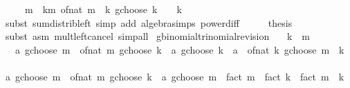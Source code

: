 \begin{isabellebody}
\ {\isachardoublequoteopen}{\isasymdots}\ {\isacharequal}{\kern0pt}\ {}\ {\isacharcircum}{\kern0pt}\ m\ {\isacharasterisk}{\kern0pt}\ {\isacharparenleft}{\kern0pt}{\isasymSum}k{\isasymle}m{\isachardot}{\kern0pt}\ {\isacharparenleft}{\kern0pt}of{\isacharunderscore}{\kern0pt}nat\ {\isacharparenleft}{\kern0pt}m\ {\isacharplus}{\kern0pt}\ k{\isacharparenright}{\kern0pt}\ gchoose\ k{\isacharparenright}{\kern0pt}\ {\isacharslash}{\kern0pt}\ {}\ {\isacharcircum}{\kern0pt}\ k{\isacharparenright}{\kern0pt}{\isachardoublequoteclose}\isanewline
\ \ \ \ \isamarkupfalse%
\ {\isacharparenleft}{\kern0pt}subst\ sum{\isacharunderscore}{\kern0pt}distrib{\isacharunderscore}{\kern0pt}left{\isacharparenright}{\kern0pt}\ {\isacharparenleft}{\kern0pt}simp\ add{\isacharcolon}{\kern0pt}\ algebra{\isacharunderscore}{\kern0pt}simps\ power{\isacharunderscore}{\kern0pt}diff{\isacharparenright}{\kern0pt}\isanewline
\ \ \isamarkupfalse%
\ \isamarkupfalse%
\ {\isacharquery}{\kern0pt}thesis\isanewline
\ \ \ \ \isamarkupfalse%
\ {\isacharparenleft}{\kern0pt}subst\ {\isacharparenleft}{\kern0pt}asm{\isacharparenright}{\kern0pt}\ mult{\isacharunderscore}{\kern0pt}left{\isacharunderscore}{\kern0pt}cancel{\isacharparenright}{\kern0pt}\ simp{\isacharunderscore}{\kern0pt}all\isanewline
{}\isamarkupfalse%
%
\endisatagproof
{\isafoldproof}%
%
\isadelimproof
\isanewline
%
\endisadelimproof
\isanewline
{}\isamarkupfalse%
\ gbinomial{\isacharunderscore}{\kern0pt}trinomial{\isacharunderscore}{\kern0pt}revision{\isacharcolon}{\kern0pt}\isanewline
\ \ \ {\isachardoublequoteopen}k\ {\isasymle}\ m{\isachardoublequoteclose}\isanewline
\ \ \ {\isachardoublequoteopen}{\isacharparenleft}{\kern0pt}a\ gchoose\ m{\isacharparenright}{\kern0pt}\ {\isacharasterisk}{\kern0pt}\ {\isacharparenleft}{\kern0pt}of{\isacharunderscore}{\kern0pt}nat\ m\ gchoose\ k{\isacharparenright}{\kern0pt}\ {\isacharequal}{\kern0pt}\ {\isacharparenleft}{\kern0pt}a\ gchoose\ k{\isacharparenright}{\kern0pt}\ {\isacharasterisk}{\kern0pt}\ {\isacharparenleft}{\kern0pt}a\ {\isacharminus}{\kern0pt}\ of{\isacharunderscore}{\kern0pt}nat\ k\ gchoose\ {\isacharparenleft}{\kern0pt}m\ {\isacharminus}{\kern0pt}\ k{\isacharparenright}{\kern0pt}{\isacharparenright}{\kern0pt}{\isachardoublequoteclose}\isanewline
%
\isadelimproof
%
\endisadelimproof
%
\isatagproof
{}\isamarkupfalse%
\ {\isacharminus}{\kern0pt}\isanewline
\ \ \isamarkupfalse%
\ {\isachardoublequoteopen}{\isacharparenleft}{\kern0pt}a\ gchoose\ m{\isacharparenright}{\kern0pt}\ {\isacharasterisk}{\kern0pt}\ {\isacharparenleft}{\kern0pt}of{\isacharunderscore}{\kern0pt}nat\ m\ gchoose\ k{\isacharparenright}{\kern0pt}\ {\isacharequal}{\kern0pt}\ {\isacharparenleft}{\kern0pt}a\ gchoose\ m{\isacharparenright}{\kern0pt}\ {\isacharasterisk}{\kern0pt}\ fact\ m\ {\isacharslash}{\kern0pt}\ {\isacharparenleft}{\kern0pt}fact\ k\ {\isacharasterisk}{\kern0pt}\ fact\ {\isacharparenleft}{\kern0pt}m\ {\isacharminus}{\kern0pt}\ k{\isacharparenright}{\kern0pt}{\isacharparenright}{\kern0pt}{\isachardoublequoteclose}\isanewline

\end{isabellebody}
